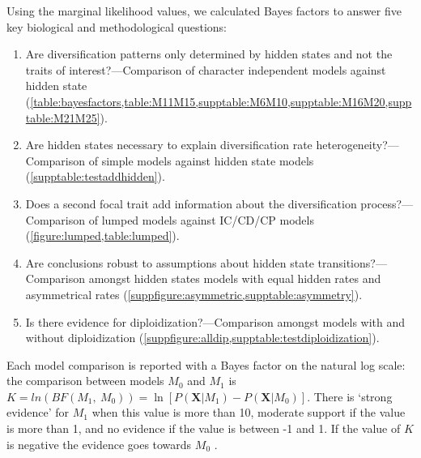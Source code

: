 Using the marginal likelihood values, we calculated Bayes factors to answer five key biological and methodological questions:
\begin{enumerate}
\item Are diversification patterns only determined by hidden states and not the traits of interest?---Comparison of character independent models against hidden state (\cref{table:bayesfactors,table:M11M15,supptable:M6M10,supptable:M16M20,supptable:M21M25}).
\item Are hidden states necessary to explain diversification rate heterogeneity?---Comparison of simple models against hidden state models (\cref{supptable:testaddhidden}).
\item Does a second focal trait add information about the diversification process?---Comparison of lumped models against IC/CD/CP models (\cref{figure:lumped,table:lumped}).
\item Are conclusions robust to assumptions about hidden state transitions?---Comparison amongst hidden states models with equal hidden rates and asymmetrical rates (\cref{suppfigure:asymmetric,supptable:asymmetry}).
\item Is there evidence for diploidization?---Comparison amongst models with and without diploidization (\cref{suppfigure:alldip,supptable:testdiploidization}).
\end{enumerate}

Each model comparison is reported with a Bayes factor on the natural log scale: the comparison between models $M_0$ and $M_1$ is $K=ln(BF(M_1,\ M_0)) = \ln[ P(\mathbf{X} | M_1) - P(\mathbf{X} | M_0)]$.
There is `strong evidence' for $M_1$ when this value is more than 10, moderate support if the value is more than 1, and no evidence if the value is between -1 and 1.
If the value of $K$ is negative the evidence goes towards $M_0$ \citep{kass1995}.

